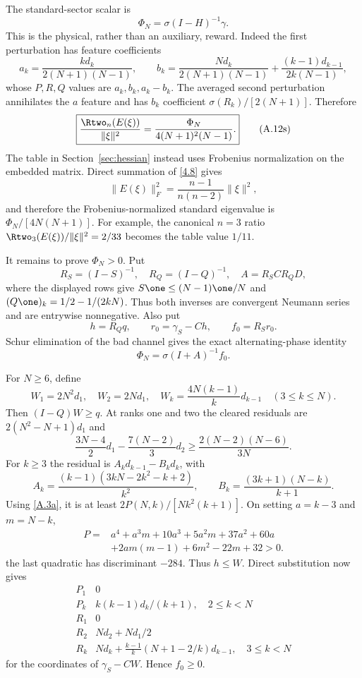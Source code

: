 The standard-sector scalar is
\[
 \Phi_N=\sigma(I-H)^{-1}\gamma.                            \tag{A.10s}\label{A.10s}
\]
This is the physical, rather than an auxiliary, reward.  Indeed the first
perturbation has feature coefficients
\[
 a_k={\frac{kd_k}{2(N+1)(N-1)}},\qquad
 b_k={\frac{Nd_k}{2(N+1)(N-1)}}
      +{\frac{(k-1)d_{k-1}}{2k(N-1)}},                         \tag{A.11s}\label{A.11s}
\]
whose $P,R,Q$ values are $a_k,b_k,a_k-b_k$.  The averaged second
perturbation annihilates the $a$ feature and has $b_k$ coefficient
$\sigma(R_k)/[2(N+1)]$.  Therefore
\[
 \boxed{{\frac{\Rtwo_n(E(\xi))}{\|\xi\|^2}}
 = {\frac{\Phi_N}{4(N+1)^2(N-1)}}.}                            \tag{A.12s}\label{A.12s}
\]
The table in Section~\ref{sec:hessian} instead uses Frobenius normalization
on the embedded matrix.  Direct summation of \eqref{4.8} gives
\[
 \|E(\xi)\|_F^2
 =\frac{n-1}{n(n-2)}\|\xi\|^2,                               \tag{A.12n}\label{A.12n}
\]
and therefore the Frobenius-normalized standard eigenvalue is
$\Phi_N/[4N(N+1)]$.  For example, the canonical $n=3$ ratio
$\Rtwo_3(E(\xi))/\|\xi\|^2=2/33$ becomes the table value $1/11$.

It remains to prove $\Phi_N>0$.  Put
\[
 R_S=(I-S)^{-1},\quad R_Q=(I-Q)^{-1},\quad
 A=R_SCR_QD,
\]
where the displayed rows give
$S\one\le(N-1)\one/N$ and
$(Q\one)_k=1/2-1/(2kN)$.  Thus both inverses are convergent Neumann series
and are entrywise nonnegative.  Also put
\[
 h=R_Qq,\qquad r_0=\gamma_S-Ch,\qquad f_0=R_Sr_0.          \tag{A.13s}\label{A.13s}
\]
Schur elimination of the bad channel gives the exact alternating-phase
identity
\[
 \Phi_N=\sigma(I+A)^{-1}f_0.                               \tag{A.14s}\label{A.14s}
\]

For $N\ge6$, define
\[
 W_1=2N^2d_1,\quad W_2=2Nd_1,\quad
 W_k={\frac{4N(k-1)}{ k}}d_{k-1}\quad(3\le k\le N).           \tag{A.15s}\label{A.15s}
\]
Then $(I-Q)W\ge q$.  At ranks one and two the cleared residuals are
$2(N^2-N+1)d_1$ and
\[
 {\frac{3N-4}{2}}d_1-{\frac{7(N-2)}{3}}d_2
 \ge {\frac{2(N-2)(N-6)}{3N}}.
\]
For $k\ge3$ the residual is $A_kd_{k-1}-B_kd_k$, with
\[
 A_k={\frac{(k-1)(3kN-2k^2-k+2)}{ k^2}},\qquad
 B_k={\frac{(3k+1)(N-k)}{ k+1}}.
\]
Using \eqref{A.3a}, it is at least
$2P(N,k)/[Nk^2(k+1)]$.  On setting $a=k-3$ and $m=N-k$,
\[
\begin{aligned}
P={}&a^4+a^3m+10a^3+5a^2m+37a^2+60a\\
   &+2am(m-1)+6m^2-22m+32>0.
\end{aligned}                                               \tag{A.16s}\label{A.16s}
\]
the last quadratic has discriminant $-284$.  Thus $h\le W$.  Direct
substitution now gives
\[
\begin{array}{c|c}
P_1&0\\
P_k&k(k-1)d_k/(k+1),\quad 2\le k<N\\
R_1&0\\
R_2&Nd_2+Nd_1/2\\
R_k&Nd_k+{\frac{k-1}{ k}}(N+1-2/k)d_{k-1},\quad 3\le k<N
\end{array}                                                \tag{A.17s}\label{A.17s}
\]
for the coordinates of $\gamma_S-CW$.  Hence $f_0\ge0$.

